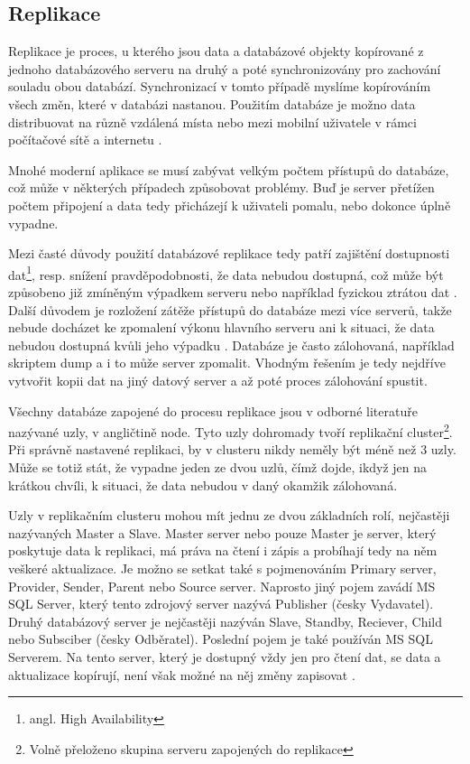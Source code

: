         \subsection{Replikace}
        \label{kReplikace}
Replikace je proces, u kterého jsou data a databázové objekty kopírované z jednoho databázového serveru na druhý a poté synchronizovány pro zachování souladu obou databází. Synchronizací v tomto případě myslíme kopírováním všech změn, které v databázi nastanou. Použitím databáze je možno data distribuovat na různě vzdálená místa nebo mezi mobilní uživatele v rámci počítačové sítě a internetu \citep{Microsoft2013}.

Mnohé moderní aplikace se musí zabývat velkým počtem přístupů do databáze, což může v některých případech způsobovat problémy. Buď je server přetížen počtem připojení a data tedy přicházejí k uživateli pomalu, nebo dokonce úplně vypadne. 

Mezi časté důvody použití databázové replikace tedy patří zajištění dostupnosti dat\footnote{angl. High Availability}, resp. snížení pravděpodobnosti, že data nebudou dostupná, což může být způsobeno již zmíněným výpadkem serveru nebo například fyzickou ztrátou dat \citep{ObeHsu2012}. Další důvodem je rozložení zátěže přístupů do databáze mezi více serverů, takže nebude docházet ke zpomalení výkonu hlavního serveru ani k situaci, že data nebudou dostupná kvůli jeho výpadku \citep{BellKindahlThalmann2010}. Databáze je často zálohovaná, například skriptem dump a i to může server zpomalit. Vhodným řešením je tedy nejdříve vytvořit kopii dat na jiný datový server a až poté proces zálohování spustit. 

Všechny databáze zapojené do procesu replikace jsou v odborné literatuře nazývané uzly, v angličtině node. Tyto uzly dohromady tvoří replikační cluster\footnote{Volně přeloženo skupina serveru zapojených do replikace}. Při správně nastavené replikaci, by v clusteru nikdy neměly být méně než 3 uzly. Může se totiž stát, že vypadne jeden ze dvou uzlů, čímž dojde, ikdyž jen na krátkou chvíli, k situaci, že data nebudou v daný okamžik zálohovaná. 

Uzly v replikačním clusteru mohou mít jednu ze dvou základních rolí, nejčastěji nazývaných Master a Slave. Master server nebo pouze Master je server, který poskytuje data k replikaci, má práva na čtení i zápis a probíhají tedy na něm veškeré aktualizace. Je možno se setkat také s pojmenováním Primary server, Provider, Sender, Parent nebo Source server. Naprosto jiný pojem zavádí MS SQL Server, který tento zdrojový server nazývá Publisher (česky Vydavatel). Druhý databázový server je nejčastěji nazýván Slave, Standby, Reciever, Child nebo Subsciber (česky Odběratel). Poslední pojem je také používán MS SQL Serverem. Na tento server, který je dostupný vždy jen pro čtení dat, se data a aktualizace kopírují, není však možné na něj změny zapisovat \citep{RiggsKrossing2010}.

